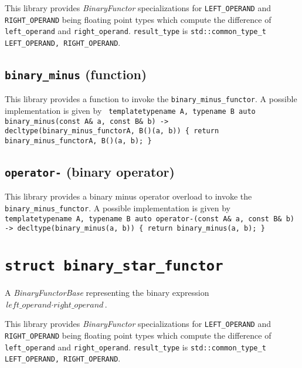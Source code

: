 \documentclass[oneside]{book}
\begin{document}
\noindent{}This library provides \textit{BinaryFunctor}         specializations for
\texttt{LEFT\_OPERAND} and   \texttt{RIGHT\_OPERAND} being     floating point types
which compute the difference of \texttt{left\_operand} and \texttt{right\_operand}.
\texttt{result\_type} is \texttt{std::common\_type\_t  \textlangle   LEFT\_OPERAND,
RIGHT\_OPERAND\textrangle}.

\subsection{\texttt{binary\_minus} (function)}
This library provides a function to invoke the \texttt{binary\_minus\_functor}.
A possible implementation is given by\newline
\texttt{
template\textlangle typename A, typename B\textrangle\newline
auto binary\_minus(const A\& a, const B\& b) -> decltype(binary\_minus\_functor\textlangle A, B\textrangle()(a, b))\newline
\{ return binary\_minus\_functor\textlangle A, B\textrangle()(a, b); \}
}

\subsection{\texttt{operator-} (binary operator)}
This library provides a binary minus operator overload to invoke the \texttt{binary\_minus\_functor}.
A possible implementation is given by\newline
\texttt{
template\textlangle typename A, typename B\textrangle\newline
auto operator-(const A\& a, const B\& b) -> decltype(binary\_minus(a, b))\newline
\{ return binary\_minus(a, b); \}
}

\section{\texttt{struct binary\_star\_functor}}
A \textit{BinaryFunctorBase} representing the binary expression $\textit{left\_operand} \cdot \textit{right\_operand}$.\newline

\noindent{}This library provides \textit{BinaryFunctor}         specializations for
\texttt{LEFT\_OPERAND} and   \texttt{RIGHT\_OPERAND} being     floating point types
which compute the difference of \texttt{left\_operand} and \texttt{right\_operand}.
\texttt{result\_type} is \texttt{std::common\_type\_t  \textlangle   LEFT\_OPERAND,
RIGHT\_OPERAND\textrangle}.
\end{document}
